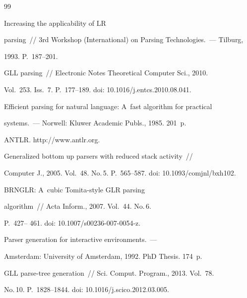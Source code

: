 {{\begin{thebibliography}{99}


   Increasing the applicability of LR 


  parsing~/\!\!/  3rd Workshop (International) on Parsing Technologies.~--- Tilburg,


   1993. P.~187--201.




   GLL parsing~/\!\!/ Electronic Notes Theoretical Computer Sci., 2010.


Vol.~253. Iss.~7. P.~177--189. doi: 10.1016/j.entcs.2010.08.041.




   Efficient parsing for natural language: A~fast algorithm for practical


  systems.~--- Norwell: Kluwer Academic Publs., 1985. 201~p.




  ANTLR. {\sf http://www.antlr.org}.







   Generalized bottom up parsers with reduced stack activity~/\!\!/


Computer J., 2005. Vol.~48. No.\,5. P.~565--587. doi: 10.1093/comjnl/bxh102.







   BRNGLR: A~cubic Tomita-style GLR parsing


algorithm~/\!\!/ Acta Inform., 2007. Vol.~44. No.\,6.


P.~427-- 461. doi: 10.1007/s00236-007-0054-z.







   Parser generation for interactive environments.~---


  Amsterdam: University of Amsterdam, 1992.  PhD Thesis. 174~p.




   GLL parse-tree generation~/\!\!/ Sci. Comput. Program., 2013. Vol.~78.


No.\,10. P.~1828--1844. doi: 10.1016/j.scico.2012.03.005.



\end{thebibliography}}}
